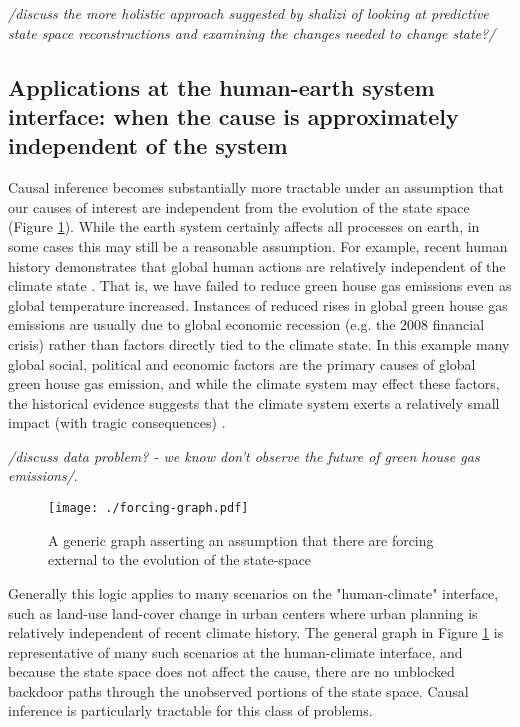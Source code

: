 \documentclass[12pt]{article}
\begin{document}
\textit{/discuss the more holistic approach suggested by shalizi of
  looking at predictive state space reconstructions and examining the
  changes needed to change state?/}

\subsection{Applications at the human-earth system interface: when the
  cause is approximately independent of the system}
\label{human}

Causal inference becomes substantially more tractable under an
assumption that our causes of interest are independent from the
evolution of the state space (Figure \ref{fig:forcing}). While the
earth system certainly affects all processes on earth, in some cases
this may still be a reasonable assumption. For example, recent human
history demonstrates that global human actions are relatively
independent of the climate state \citep{arto2014drivers}. That is, we
have failed to reduce green house gas emissions even as global
temperature increased. Instances of reduced rises in global green
house gas emissions are usually due to global economic recession
(e.g. the 2008 financial crisis) rather than factors directly tied to
the climate state. In this example many global social, political and
economic factors are the primary causes of global green house gas
emission, and while the climate system may effect these factors, the
historical evidence suggests that the climate system exerts a
relatively small impact (with tragic consequences)
\citep{arto2014drivers}.

\emph{/discuss data problem? - we know
  don't observe the future of green house gas emissions/}.

\begin{figure}
  \texttt{[image: ./forcing-graph.pdf]}
  \caption{A generic graph asserting an assumption that there are
    forcing external to the evolution of the state-space}
  \label{fig:forcing}
\end{figure}

Generally this logic applies to many scenarios on the "human-climate"
interface, such as land-use land-cover change in urban centers where
urban planning is relatively independent of recent climate
history. The general graph in Figure \ref{fig:forcing} is
representative of many such scenarios at the human-climate interface,
and because the state space does not affect the cause, there are no
unblocked backdoor paths through the unobserved portions of the state
space. Causal inference is particularly tractable for this class of
problems.
\end{document}
